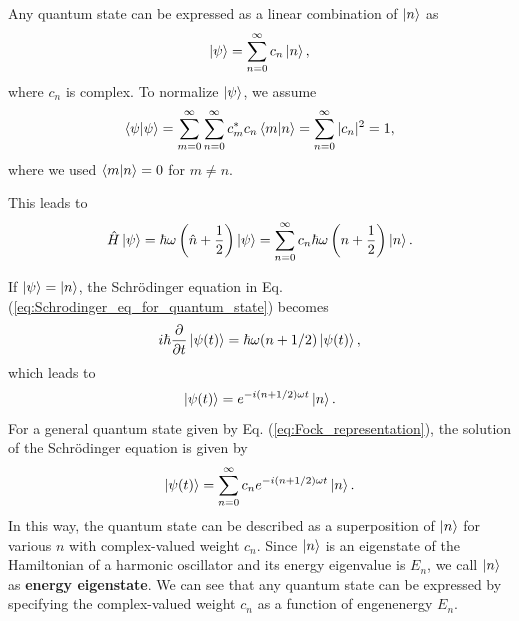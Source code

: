 Any quantum state can be expressed as a linear combination of $\ket n$ as
\begin{equation}
  \ket \psi = \sum_{n=0}^{\infty}c_n\ket n,
  \label{eq:Fock_representation}
\end{equation}
where $c_n$ is complex. To normalize $\ket \psi$, we assume
\begin{equation}
  \braket{\psi|\psi} = \sum_{m=0}^{\infty}\sum_{n=0}^{\infty}c_m^*c_n\braket{m|n}=\sum_{n = 0}^{\infty}|c_n|^2 = 1,
\end{equation}
where we used $\braket{m|n} = 0$ for $m\neq n$. 

This leads to
\begin{equation}
  \hat H \ket \psi = \hbar \omega \left(\hat n + \frac 1 2 \right)\ket \psi = \sum_{n=0}^{\infty} c_n \hbar \omega \left(n + \frac{1}{2}\right)\ket n.
\end{equation}

If $\ket \psi = \ket n$, the Schr\"odinger equation in Eq. (\ref{eq:Schrodinger_eq_for_quantum_state}) becomes 
\begin{equation}
  i\hbar \frac{\partial}{\partial t}\ket{\psi(t)}= \hbar \omega (n + 1/2)\ket {\psi(t)},
\end{equation}
which leads to
\begin{equation}
  \ket{\psi(t)} = e^{-i(n + 1/2)\omega t}\ket n.
\end{equation}
For a general quantum state given by Eq. (\ref{eq:Fock_representation}), the solution of the Schr\"odinger equation is given by
\begin{equation}
  \ket{\psi(t)} = \sum_{n=0}^{\infty}c_n e^{-i(n+1/2)\omega t}\ket n.
\end{equation}
In this way, the quantum state can be described as a superposition of $\ket n$ for various $n$ with complex-valued weight $c_n$. Since $\ket n$ is an eigenstate of the Hamiltonian of a harmonic oscillator and its energy eigenvalue is $E_n$, we call $\ket n$ as \textbf{energy eigenstate}. We can see that any quantum state can be expressed by specifying the complex-valued weight $c_n$ as a function of engenenergy $E_n$. 

